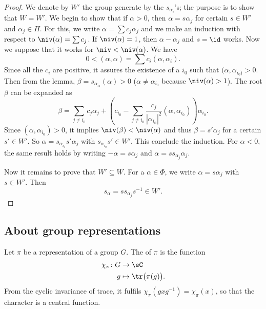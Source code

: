 \begin{proof}
We denote by $W'$ the group generate by the $s_{\alpha_i}$'s; the purpose is to show that $W=W'$. We begin to show that if $\alpha>0$, then $\alpha=s\alpha_j$ for certain $s\in W'$ and $\alpha_j\in\Pi$. For this, we write $\alpha=\sum c_j\alpha_j$ and we make an induction with respect to $\niv(\alpha)=\sum c_j$. If $\niv(\alpha)=1$, then $\alpha-\alpha_j$ and $s=\id$ works.  Now we suppose that it works for $\niv<\niv(\alpha)$. We have
\[
   0<(\alpha,\alpha)=\sum c_i(\alpha,\alpha_i).
\]
Since all the $c_i$ are positive, it assures the existence of a $i_0$ such that $(\alpha,\alpha_{i_0)}>0$. Then from the lemma, $\beta=s_{\alpha_{i_0}}(\alpha)>0$ ($\alpha\neq \alpha_{i_0}$ because $\niv(\alpha)>1$). The root $\beta$ can be expanded as
\begin{equation}
\beta=\sum_{j \neq i_0}c_j\alpha_j+\left(  c_{i_0}-\sum_{j\neq i_0}\frac{c_j}{|\alpha_{i_0}|^2}(\alpha,\alpha_{i_0})   \right)\alpha_{i_0}.
\end{equation}
Since $(\alpha,\alpha_{i_0})>0$, it implies $\niv(\beta)<\niv(\alpha)$ and thus $\beta=s'\alpha_j$ for a certain $s'\in W'$. So $\alpha=s_{\alpha_{i_0}}s'\alpha_j$ with $s_{\alpha_{i_0}}s'\in W'$. This conclude the induction. For $\alpha<0$, the same result holds by writing $-\alpha=s\alpha_j$ and $\alpha=ss_{\alpha_j}\alpha_j$.

Now it remains to prove that $W'\subseteq W$. For a $\alpha\in\Phi$, we write $\alpha=s\alpha_j$ with $s\in W'$. Then
\[
   s_{\alpha}=ss_{\alpha_j}s^{-1}\in W'.
\]
\end{proof}

\subsection{About group representations}

Let $\pi$ be a representation of a group $G$. The  of $\pi$ is the function
\begin{equation}
    \begin{aligned}
        \chi_{\pi}\colon G&\to\eC \\ 
        g&\mapsto \tr\big( \pi(g) \big). 
    \end{aligned}
\end{equation}
From the cyclic invariance of trace, it fulfils $\chi_{\pi}(gxg^{-1})=\chi_{\pi}(x)$, so that the character is a central function.

